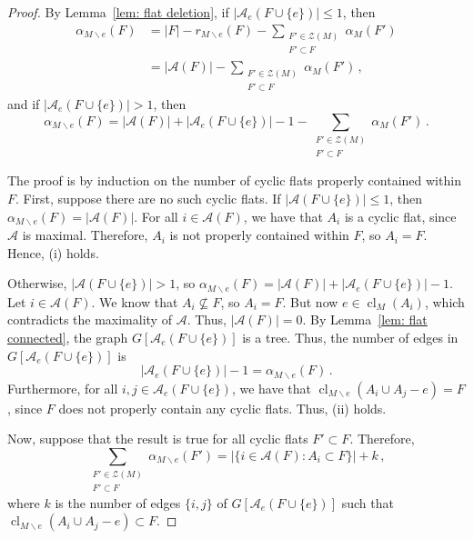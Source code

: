 \documentclass[11pt, reqno]{amsart}
\DeclareMathOperator{\cl}{cl}
\begin{document}
\begin{proof}
By Lemma~\ref{lem: flat deletion}, if $|\mathcal A_e(F \cup \{e\})| \leq 1$, then
\begin{align*}
\alpha_{M \backslash e}(F) &= |F| - r_{M \backslash e}(F) - \sum_{\substack{F' \in \mathcal Z(M) \\ F' \subset F}} \alpha_M(F') \\
&= |\mathcal A(F)| - \sum_{\substack{F' \in \mathcal Z(M) \\ F' \subset F}} \alpha_M(F') \,,
\end{align*}
and if $|\mathcal A_e(F \cup \{e\})| > 1$, then
$$
\alpha_{M \backslash e}(F) = |\mathcal A(F)| + |\mathcal A_e(F \cup \{e\})| - 1 - \sum_{\substack{F' \in \mathcal Z(M) \\ F' \subset F}} \alpha_M(F') \,.
$$
	
The proof is by induction on the number of cyclic flats properly contained within $F$. First, suppose there are no such cyclic flats. If $|\mathcal A(F \cup \{e\})| \leq 1$, then $\alpha_{M \backslash e}(F) = |\mathcal A(F)|$. For all $i \in \mathcal A(F)$, we have that $A_i$ is a cyclic flat, since $\mathcal A$ is maximal. Therefore, $A_i$ is not properly contained within $F$, so $A_i = F$. Hence, (i) holds.

Otherwise, $|\mathcal A(F \cup \{e\})| > 1$, so $\alpha_{M \backslash e}(F) = |\mathcal A(F)| + |\mathcal A_e(F \cup \{e\})| - 1$. Let $i \in \mathcal A(F)$. We know that $A_i \not\subseteq F$, so $A_i = F$. But now $e \in \cl_M(A_i)$, which contradicts the maximality of $\mathcal A$. Thus, $|\mathcal A(F)| = 0$. By Lemma~\ref{lem: flat connected}, the graph $G[\mathcal A_e(F \cup \{e\})]$ is a tree. Thus, the number of edges in $G[\mathcal A_e(F \cup \{e\})]$ is
$$
|\mathcal A_e(F \cup \{e\})| - 1 = \alpha_{M \backslash e}(F) \,.
$$
Furthermore, for all $i, j \in \mathcal A_e(F \cup \{e\})$, we have that $\cl_{M \backslash e}(A_i \cup A_j - e) = F$, since $F$ does not properly contain any cyclic flats. Thus, (ii) holds.

Now, suppose that the result is true for all cyclic flats $F' \subset F$. Therefore,
$$
\sum_{\substack{F' \in \mathcal Z(M) \\ F' \subset F}} \alpha_{M \backslash e}(F') = |\{i \in \mathcal A(F) : A_i \subset F\}| + k \,,
$$
where $k$ is the number of edges $\{i,j\}$ of $G[\mathcal A_e(F \cup \{e\})]$ such that $\cl_{M \backslash e}(A_i \cup A_j - e) \subset F$.


\end{proof}
\end{document}
